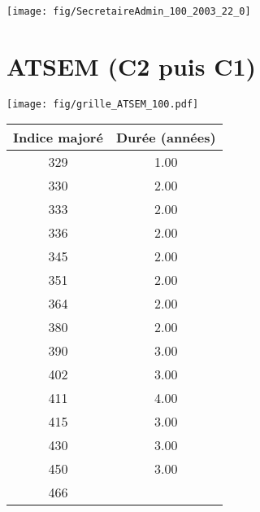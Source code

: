  \vspace{0.1cm} 

 {\hspace{-2.2cm}\texttt{[image: fig/SecretaireAdmin\_100\_2003\_22\_0]}} 

\newpage 
 
\chapter{ATSEM (C2 puis C1)} 

\begin{minipage}{0.55\linewidth}\texttt{[image: fig/grille\_ATSEM\_100.pdf]}\end{minipage} 
\begin{minipage}{0.3\linewidth} 
 \begin{center} 

\begin{tabular}[htb]{|c|c|} 
\hline 
 Indice majoré &  Durée (années) \\ 
\hline \hline 
 329 &  1.00 \\ 
\hline 
 330 &  2.00 \\ 
\hline 
 333 &  2.00 \\ 
\hline 
 336 &  2.00 \\ 
\hline 
 345 &  2.00 \\ 
\hline 
 351 &  2.00 \\ 
\hline 
 364 &  2.00 \\ 
\hline 
 380 &  2.00 \\ 
\hline 
 390 &  3.00 \\ 
\hline 
 402 &  3.00 \\ 
\hline 
 411 &  4.00 \\ 
\hline 
 415 &  3.00 \\ 
\hline 
 430 &  3.00 \\ 
\hline 
 450 &  3.00 \\ 
\hline 
 466 &   \\ 
\hline 
\hline 
\end{tabular} 
\end{center} 
 \end{minipage} 

~\\ 
 


   
 \localtableofcontents 

